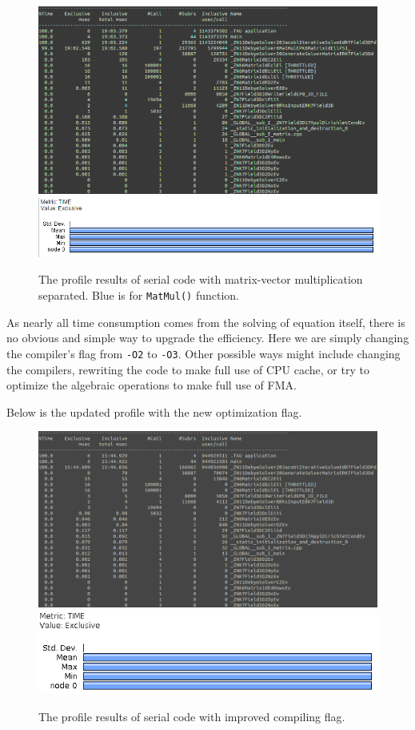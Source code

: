 \documentclass{article}
\begin{document}
\begin{spacing}{1.1}
\begin{figure}[H]
  \centering
  \includegraphics[width=\linewidth]{output/serial-separated-text.png}
  \includegraphics[width=0.6\linewidth]{output/serial-separated.png}
  \caption{The profile results of serial code with matrix-vector multiplication separated. Blue is for \texttt{MatMul()} function.}
  \label{fig-testcase}
\end{figure}

As nearly all time consumption comes from the solving of equation itself, there is no obvious and simple way to upgrade the efficiency. Here we are simply changing the compiler's flag from \texttt{-O2} to \texttt{-O3}. Other possible ways might include changing the compilers, rewriting the code to make full use of CPU cache, or try to optimize the algebraic operations to make full use of FMA.

Below is the updated profile with the new optimization flag.

\begin{figure}[H]
  \centering
  \includegraphics[width=\linewidth]{output/serial-improved-text.png}
  \includegraphics[width=0.6\linewidth]{output/serial-improved.png}
  \caption{The profile results of serial code with improved compiling flag.}
  \label{fig-testcase}
\end{figure}


\end{spacing}
\end{document}
